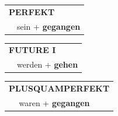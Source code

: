 \documentclass[10pt,a4paper]{revtex4-2}
\begin{document}
\begin{verbbox-acc}
    \vspace{10pt}

 \begin{tabular}{rl}
     \multicolumn{2}{l}{\textbf{PERFEKT}}\\
   & sein + \textbf{gegangen}\\
  \end{tabular}
\hfill
   \begin{tabular}{rl}
   
    \multicolumn{2}{l}{\textbf{FUTURE I} }\\
   & werden + \textbf{gehen}\\
 
  \end{tabular}
\hfill
   \begin{tabular}{rl}
      \multicolumn{2}{l}{\textbf{PLUSQUAMPERFEKT}}\\
   & waren + \textbf{gegangen}\\
  \end{tabular}
  
  \vspace{-5pt}


\end{verbbox-acc}
\end{document}
